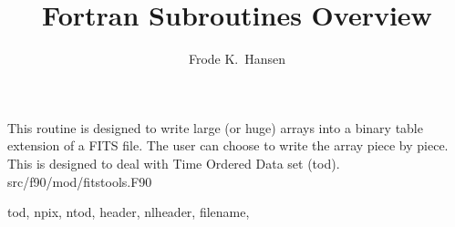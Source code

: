 
\sloppy


\title{\healpix Fortran Subroutines Overview}
 \section[write\_bintabh]{ }
\label{sub:write_bintabh}
\author{Frode K.~Hansen}

\begin{facility}
{This routine is designed to write large (or huge) arrays into a binary table
extension of a FITS file. The user can
choose to write the array piece by piece. This is designed to deal with Time
Ordered Data set (tod).}
{src/f90/mod/fitstools.F90}
\end{facility}

\begin{f90format}
{tod, npix, ntod, header, nlheader, filename, }
\end{f90format}
\aboutoptional

